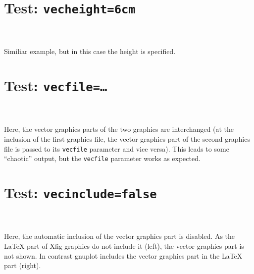 \documentclass[DIV12]{scrartcl}
\newcommand*\combinput[1]{%
  \begin{picture}(0,0)%
    \texttt{[image: \#1]}%
  \end{picture}%
}
\begin{document}
  \clearpage

  \section*{Test: \texttt{vecheight=6cm}}
  \noindent
  \fbox{\combinput{xfig325}}%
  \fbox{}\\[3ex]
  \\[3ex]
  Similiar example, but in this case the height is specified.

  \clearpage

  \section*{Test: \texttt{vecfile=\ldots}}
  \noindent
  \fbox{\combinput{xfig325}}%
  \fbox{}\\[3ex]
  \\[3ex]
  Here, the vector graphics parts of the two graphics are interchanged (at the
  inclusion of the first graphics file, the vector graphics part of the second
  graphics file is passed to its \texttt{vecfile} parameter and vice versa).
  This leads to some ``chaotic'' output, but the \texttt{vecfile} parameter
  works as expected.

  \clearpage

  \section*{Test: \texttt{vecinclude=false}}
  \noindent
  \fbox{\combinput{xfig325}}%
  \fbox{}\\[3ex]
  \\[3ex]
  Here, the automatic inclusion of the vector graphics part is disabled.  As
  the \LaTeX{} part of Xfig graphics do not include it (left), the vector
  graphics part is not shown.  In contrast gnuplot includes the vector graphics
  part in the \LaTeX{} part (right).

  \clearpage
\end{document}
